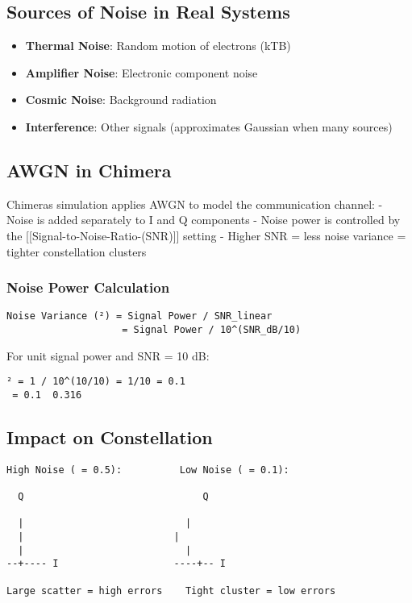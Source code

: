 \subsection{Sources of Noise in Real
Systems}\label{sources-of-noise-in-real-systems}

\begin{itemize}
\tightlist
\item
  \textbf{Thermal Noise}: Random motion of electrons (kTB)
\item
  \textbf{Amplifier Noise}: Electronic component noise
\item
  \textbf{Cosmic Noise}: Background radiation
\item
  \textbf{Interference}: Other signals (approximates Gaussian when many
  sources)
\end{itemize}

\subsection{AWGN in Chimera}\label{awgn-in-chimera}

Chimera\textquotesingle s simulation applies AWGN to model the
communication channel: - Noise is added separately to I and Q components
- Noise power is controlled by the
{[}{[}Signal-to-Noise-Ratio-(SNR){]}{]} setting - Higher SNR = less
noise variance = tighter constellation clusters

\subsubsection{Noise Power Calculation}\label{noise-power-calculation}

\begin{verbatim}
Noise Variance (²) = Signal Power / SNR_linear
                    = Signal Power / 10^(SNR_dB/10)
\end{verbatim}

For unit signal power and SNR = 10 dB:

\begin{verbatim}
² = 1 / 10^(10/10) = 1/10 = 0.1
 = 0.1  0.316
\end{verbatim}

\subsection{Impact on Constellation}\label{impact-on-constellation}

\begin{verbatim}
High Noise ( = 0.5):          Low Noise ( = 0.1):
  
  Q                               Q
                                 
  |                            |  
  |                          | 
  |                            |  
--+---- I                    ----+-- I

Large scatter = high errors    Tight cluster = low errors
\end{verbatim}

